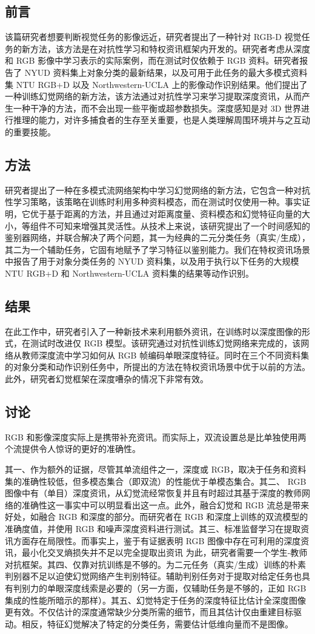 \subsection{前言}
该篇研究者想要判断视觉任务的影像远近，研究者提出了一种针对 RGB-D 视觉任务的新方法，该方法是在对抗性学习和特权资讯框架内开发的。研究者考虑从深度和 RGB 影像中学习表示的实际案例，而在测试时仅依赖于 RGB 资料。研究者报告了 NYUD 资料集上对象分类的最新结果，以及可用于此任务的最大多模式资料集 NTU RGB+D 
以及 Northwestern-UCLA 上的影像动作识别结果。他们提出了一种训练幻觉网络的新方法，该方法通过对抗性学习来学习提取深度资讯，从而产生一种干净的方法，而不会出现一些平衡或超参数损失。深度感知是对 3D 世界进行推理的能力，对许多捕食者的生存至关重要，也是人类理解周围环境并与之互动的重要技能。
\subsection{方法}
研究者提出了一种在多模式流网络架构中学习幻觉网络的新方法，它包含一种对抗性学习策略，该策略在训练时利用多种资料模态，而在测试时仅使用一种。事实证明，它优于基于距离的方法，并且通过对距离度量、资料模态和幻觉特征向量的大小，等组件不可知来增强其灵活性。从技术上来说，该研究提出了一个时间感知的鉴别器网络，并联合解决了两个问题，其一为经典的二元分类任务（真实/生成），其二为一个辅助任务，它固有地赋予了学习特征以鉴别能力。我们在特权资讯场景中报告了用于对象分类任务的 NYUD 资料集，以及用于执行以下任务的大规模 NTU RGB+D 和 Northwestern-UCLA 资料集的结果等动作识别。
\subsection{结果}
在此工作中，研究者引入了一种新技术来利用额外资讯，在训练时以深度图像的形式，在测试时改进仅 RGB 模型。该研究通过对抗性训练幻觉网络来完成的，该网络从教师深度流中学习如何从 RGB 帧编码单眼深度特征。同时在三个不同资料集的对象分类和动作识别任务中，所提出的方法在特权资讯场景中优于以前的方法。此外，研究者幻觉框架在深度嘈杂的情况下非常有效。
\subsection{讨论}
RGB 和影像深度实际上是携带补充资讯。而实际上，双流设置总是比单独使用两个流提供令人惊讶的更好的准确性。

其一、作为额外的证据，尽管其单流组件之一，深度或 RGB，取决于任务和资料集的准确性较低，但多模态集合（即双流）的性能优于单模态集合。其二、 RGB 图像中有（单目）深度资讯，从幻觉流经常恢复并且有时超过其基于深度的教师网络的准确性这一事实中可以明显看出这一点。此外，融合幻觉和 RGB 流总是带来好处，如融合 RGB 和深度的部分。而研究者在 RGB 和深度上训练的双流模型的准确度值，并使用 RGB 和噪声深度资料进行测试。其三、标准监督学习在提取资讯方面存在局限性。而事实上，鉴于有证据表明 RGB 图像中存在可利用的深度资讯，最小化交叉熵损失并不足以完全提取出资讯
为此，研究者需要一个学生-教师对抗框架。其四、仅靠对抗训练是不够的。为二元任务（真实/生成）训练的朴素判别器不足以迫使幻觉网络产生判别特征。辅助判别任务对于提取对给定任务也具有判别力的单眼深度线索是必要的（另一方面，仅辅助任务是不够的，正如 RGB 集成的性能所暗示的那样）。其五、幻觉特定于任务的深度特征比估计全深度图像更有效。不仅估计的深度通常缺少分类所需的细节，而且其估计仅由重建目标驱动。相反，特征幻觉解决了特定的分类任务，需要估计低维向量而不是图像。
